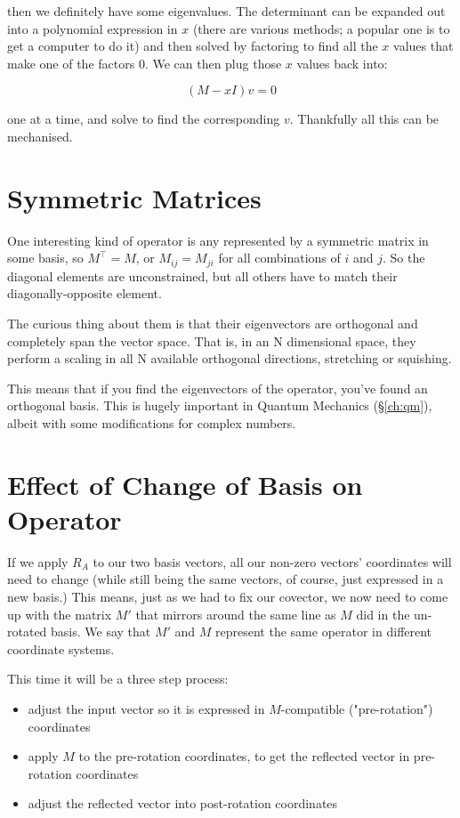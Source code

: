 then we definitely have some eigenvalues. The determinant can be expanded out into a polynomial expression in $x$ (there are various methods; a popular one is to get a computer to do it) and then solved by factoring to find all the $x$ values that make one of the factors $0$. We can then plug those $x$ values back into:

$$(M - xI)v = 0$$

one at a time, and solve to find the corresponding $v$. Thankfully all this can be mechanised.

\section{Symmetric Matrices}\label{ch:vectors-symmetric}

One interesting kind of operator is any represented by a symmetric matrix in some basis, so $M^\intercal = M$, or $M_{ij} = M_{ji}$ for all combinations of $i$ and $j$. So the diagonal elements are unconstrained, but all others have to match their diagonally-opposite element.

The curious thing about them is that their eigenvectors are orthogonal and completely span the vector space. That is, in an N dimensional space, they perform a scaling in all N available orthogonal directions, stretching or squishing.

This means that if you find the eigenvectors of the operator, you've found an orthogonal basis. This is hugely important in Quantum Mechanics (§\ref{ch:qm}), albeit with some modifications for complex numbers.

\section{Effect of Change of Basis on Operator}

If we apply $R_A$ to our two basis vectors, all our non-zero vectors' coordinates will need to change (while still being the same vectors, of course, just expressed in a new basis.) This means, just as we had to fix our covector, we now need to come up with the matrix $M'$ that mirrors around the same line as $M$ did in the un-rotated basis. We say that $M'$ and $M$ represent the same operator in different coordinate systems.

This time it will be a three step process:

\begin{itemize}
    \item adjust the input vector so it is expressed in $M$-compatible ("pre-rotation") coordinates
    \item apply $M$ to the pre-rotation coordinates, to get the reflected vector in pre-rotation coordinates
    \item adjust the reflected vector into post-rotation coordinates
\end{itemize}

